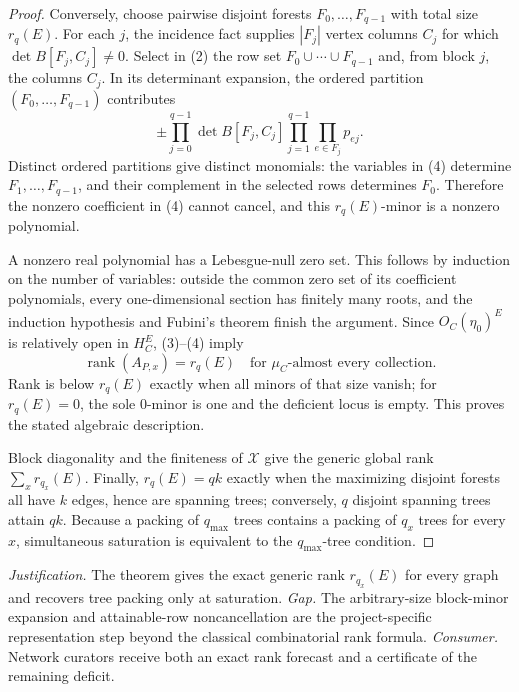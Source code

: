 \documentclass{article}
\begin{document}
\begin{proof}
Conversely, choose pairwise disjoint forests \(F_0,\ldots,F_{q-1}\) with total size \(r_q(E)\).  For each \(j\), the incidence fact supplies \(|F_j|\) vertex columns \(C_j\) for which \(\det B[F_j,C_j]\ne0\).  Select in (2) the row set \(F_0\cup\cdots\cup F_{q-1}\) and, from block \(j\), the columns \(C_j\).  In its determinant expansion, the ordered partition \((F_0,\ldots,F_{q-1})\) contributes
\[
\pm\prod_{j=0}^{q-1}\det B[F_j,C_j]
\prod_{j=1}^{q-1}\prod_{e\in F_j}p_{ej}.
\tag{4}
\]
Distinct ordered partitions give distinct monomials: the variables in (4) determine \(F_1,\ldots,F_{q-1}\), and their complement in the selected rows determines \(F_0\).  Therefore the nonzero coefficient in (4) cannot cancel, and this \(r_q(E)\)-minor is a nonzero polynomial.

A nonzero real polynomial has a Lebesgue-null zero set.  This follows by induction on the number of variables: outside the common zero set of its coefficient polynomials, every one-dimensional section has finitely many roots, and the induction hypothesis and Fubini's theorem finish the argument.  Since \(O_C(\eta_0)^E\) is relatively open in \(H_C^E\), (3)--(4) imply
\[
\operatorname{rank}(A_{P,x})=r_q(E)
\quad\text{for }\mu_C\text{-almost every collection}.
\tag{5}
\]
Rank is below \(r_q(E)\) exactly when all minors of that size vanish; for \(r_q(E)=0\), the sole \(0\)-minor is one and the deficient locus is empty.  This proves the stated algebraic description.

Block diagonality and the finiteness of \(\mathcal X\) give the generic global rank \(\sum_xr_{q_x}(E)\).  Finally, \(r_q(E)=qk\) exactly when the maximizing disjoint forests all have \(k\) edges, hence are spanning trees; conversely, \(q\) disjoint spanning trees attain \(qk\).  Because a packing of \(q_{\max}\) trees contains a packing of \(q_x\) trees for every \(x\), simultaneous saturation is equivalent to the \(q_{\max}\)-tree condition.
\end{proof}
\par\smallskip\noindent \textit{Justification.} The theorem gives the exact generic rank \(r_{q_x}(E)\) for every graph and recovers tree packing only at saturation. \textit{Gap.} The arbitrary-size block-minor expansion and attainable-row noncancellation are the project-specific representation step beyond the classical combinatorial rank formula. \textit{Consumer.} Network curators receive both an exact rank forecast and a certificate of the remaining deficit.
\end{document}
